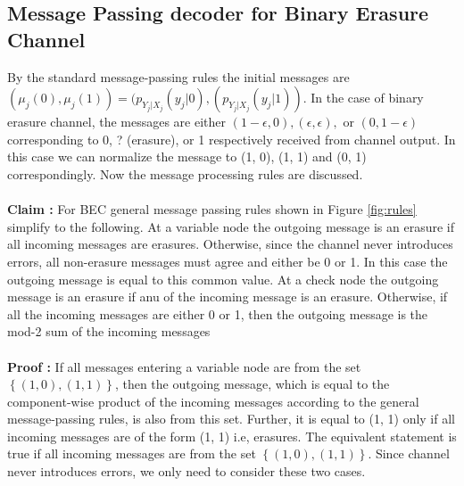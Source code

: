 \subsection{Message Passing decoder for Binary Erasure Channel}
By the standard message-passing rules the initial messages are $(\mu_j(0), \mu_j(1)) = (p_{Y_j|X_j}(y_j|0),(p_{Y_j|X_j}(y_j|1))$. In the case of binary erasure channel, the messages are
either $(1-\epsilon, 0), (\epsilon, \epsilon), \text{ or } (0, 1-\epsilon)$ corresponding to 0, ? (erasure), or 1 respectively received from channel output.
In this case we can normalize the message to (1, 0), (1, 1) and (0, 1) correspondingly. Now the message processing rules are discussed. \\
\quad \\
\textbf{Claim :} For BEC general message passing rules shown in Figure \ref{fig:rules} simplify to the following. At a variable node the outgoing message 
is an erasure if all incoming messages are erasures. Otherwise, since the channel never introduces errors, all non-erasure messages must agree and either be 0 or 1. In this case
the outgoing message is equal to this common value. At a check node the outgoing message is an erasure if anu of the incoming message is an erasure. Otherwise, if all the
incoming messages are either 0 or 1, then the outgoing message is the mod-2 sum of the incoming messages \\
\quad \\
\textbf{Proof :} If all messages entering a variable node are from the set $\left\lbrace(1, 0), (1, 1)\right\rbrace$, then the outgoing message, which is equal to the component-wise
product of the incoming messages according to the general message-passing rules, is also from this set. Further, it is equal to (1, 1) only if all incoming messages are 
of the form (1, 1) i.e, erasures. The equivalent statement is true if all incoming messages are from the set $\left\lbrace(1, 0), (1, 1)\right\rbrace$. Since channel never 
introduces errors, we only need to consider these two cases.

